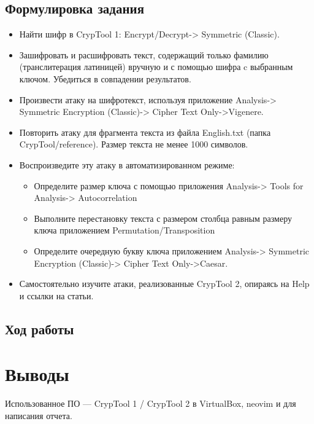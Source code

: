 \documentclass[a4paper, 14pt]{extarticle}
\begin{document}
\subsection{Формулировка задания}
\begin{itemize}
    \item Найти шифр в CrypTool 1: Encrypt/Decrypt-> Symmetric (Classic).
    \item Зашифровать и расшифровать текст, содержащий только фамилию (транслитерация латиницей) вручную и с помощью шифра c выбранным ключом. Убедиться в совпадении результатов.
    \item Произвести атаку на шифротекст, используя приложение Analysis-> Symmetric Encryption (Classic)-> Cipher Text Only->Vigenere.
    \item Повторить атаку для фрагмента текста из файла English.txt (папка CrypTool/reference). Размер текста не менее 1000 символов.
    \item Воспроизведите эту атаку в автоматизированном режиме: 
    \begin{itemize}
        \item Определите размер ключа с помощью приложения Analysis-> Tools for Analysis-> Autocorrelation
        \item Выполните перестановку текста с размером столбца равным размеру ключа приложением Permutation/Transposition
        \item Определите очередную букву ключа приложением Analysis-> Symmetric Encryption (Classic)-> Cipher Text Only->Caesar.
    \end{itemize}
    \item Самостоятельно изучите атаки, реализованные CrypTool 2,
опираясь на Help и ссылки на статьи.
\end{itemize}

\subsection{Ход работы}
\lipsum[1]

\section*{Выводы}

Использованное ПО --- CrypTool 1 / CrypTool 2 в VirtualBox, neovim и \XeLaTeX{} для написания отчета.
\end{document}
